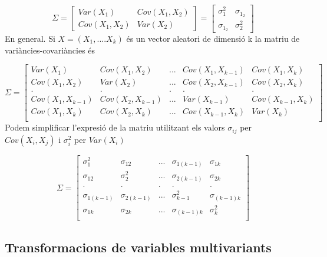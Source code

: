 \documentclass[
  catalan,
]{article}
\theoremstyle{definition}
\theoremstyle{definition}
\theoremstyle{definition}
\theoremstyle{definition}
\theoremstyle{remark}
\begin{document}
\[
\Sigma= \begin{bmatrix} Var(X_1) & Cov(X_1,X_2) \\Cov(X_1,X_2)  & Var(X_2)  \end{bmatrix} = \begin{bmatrix} \sigma_1^2 & \sigma_{1_2} \\\sigma_{1_2}  & \sigma_2^2 \end{bmatrix}
\]
En general. Si \(X=(X_1,....X_k)\) és un vector aleatori de dimensió k la matriu de variàncies-covariàncies és

\[
\Sigma=
\begin{bmatrix} 
Var(X_1) & Cov(X_1,X_2) & ... & Cov(X_1,X_{k-1})  & Cov(X_1,X_k) \\
Cov(X_1,X_2)  & Var(X_2) & ... & Cov(X_2,X_{k-1})  & Cov(X_2,X_k) \\  
.  & . & . & .  & . \\  
Cov(X_1,X_{k-1})  & Cov(X_2,X_{k-1}) & ... & Var(X_{k-1})  & Cov(X_{k-1},X_k) \\  
Cov(X_1,X_k)  & Cov(X_2,X_k) & ... &  Cov(X_{k-1},X_k)  & Var(X_k)\\  
\end{bmatrix}  
\]
Podem simplificar l'expresió de la matriu utilitzant els valors \(\sigma_{ij}\) per \(Cov(X_i,X_j)\) i \(\sigma_i^2\) per \(Var(X_i)\)

\[
\Sigma=
\begin{bmatrix} 
\sigma_1^2 & \sigma_{12} & ... & \sigma_{1(k-1)}  & \sigma_{1k} \\
\sigma_{12}  & \sigma_2^2 & ... & \sigma_{2(k-1)}  & \sigma_{2k} \\  
.  & . & . & .  & . \\  
\sigma_{1(k-1)}  & \sigma_{2(k-1)} & ... & \sigma_{k-1}^2  & \sigma_{(k-1)k} \\  
\sigma_{1k}  & \sigma_{2k} & ... &  \sigma_{(k-1)k}  & \sigma_k^2\\  
\end{bmatrix} 
\]

\subsection{Transformacions de variables multivariants}\label{transformacions-de-variables-multivariants}
\end{document}
